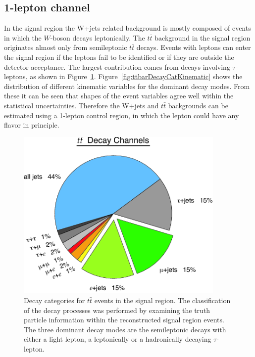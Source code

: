 \subsection{1-lepton channel}
\par In the signal region the W+jets related background is mostly composed of events in which the $W$-boson decays leptonically. The $t\bar{t}$ background in the signal region originates almost only from semileptonic $t\bar{t}$ decays. Events with leptons can enter the signal region if the leptons fail to be identified or if they are outside the detector acceptance. The largest contribution comes from decays involving $\tau$-leptons, as shown in Figure~\ref{fig:ttbarDecayCat}. Figure~\ref{fig:ttbarDecayCatKinematic} shows the distribution of different kinematic variables for the dominant decay modes. From these it can be seen that shapes of the event variables agree well within the statistical uncertainties. Therefore the W+jets and $t\bar{t}$ backgrounds can be estimated using a 1-lepton control region, in which the lepton could have any flavor in principle.

\begin{figure}[h]
    \centering
    \includegraphics[width=0.9\textwidth]{chapters/c7/figures/ttbar-decay-modes.png}
    \caption{Decay categories for $t\bar{t}$ events in the signal region. The classification of the decay processes was performed by examining the truth particle information within the reconstructed signal region events. The three dominant decay modes are the semileptonic decays with either a light lepton, a leptonically or a hadronically decaying $\tau$-lepton.}
    \label{fig:ttbarDecayCat}
\end{figure}

